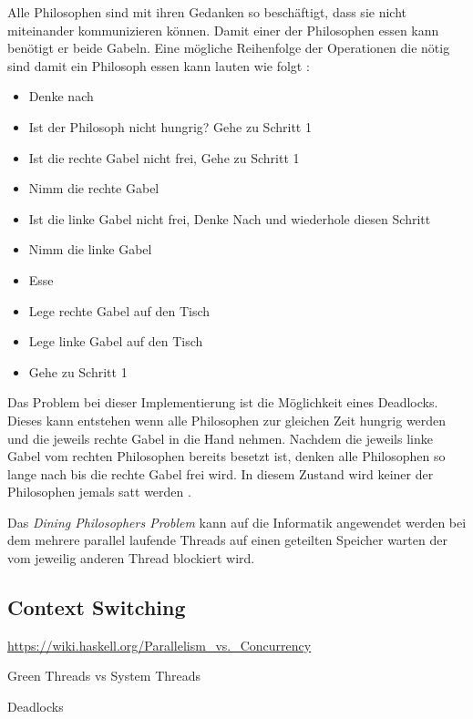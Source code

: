 Alle Philosophen sind mit ihren Gedanken so beschäftigt, dass sie nicht miteinander kommunizieren können. Damit einer der Philosophen essen kann benötigt er beide Gabeln. Eine mögliche Reihenfolge der Operationen die nötig sind damit ein Philosoph essen kann lauten wie folgt \cite[p. 21]{dij71}:

\begin{itemize}
  \item Denke nach
  \item Ist der Philosoph nicht hungrig? Gehe zu Schritt 1
  \item Ist die rechte Gabel nicht frei, Gehe zu Schritt 1
  \item Nimm die rechte Gabel
  \item Ist die linke Gabel nicht frei, Denke Nach und wiederhole diesen Schritt
  \item Nimm die linke Gabel
  \item Esse
  \item Lege rechte Gabel auf den Tisch  
  \item Lege linke Gabel auf den Tisch
  \item Gehe zu Schritt 1
\end{itemize}

Das Problem bei dieser Implementierung ist die Möglichkeit eines Deadlocks. Dieses kann entstehen wenn alle Philosophen zur gleichen Zeit hungrig werden und die jeweils rechte Gabel in die Hand nehmen. Nachdem die jeweils linke Gabel vom rechten Philosophen bereits besetzt ist, denken alle Philosophen so lange nach bis die rechte Gabel frei wird. In diesem Zustand wird keiner der Philosophen jemals satt werden \cite[p. 21]{dij71}. 

Das \emph{Dining Philosophers Problem} kann auf die Informatik angewendet werden bei dem mehrere parallel laufende Threads auf einen geteilten Speicher warten der vom jeweilig anderen Thread blockiert wird. 




\subsection{Context Switching}



\url{https://wiki.haskell.org/Parallelism_vs._Concurrency}

Green Threads vs System Threads

Deadlocks